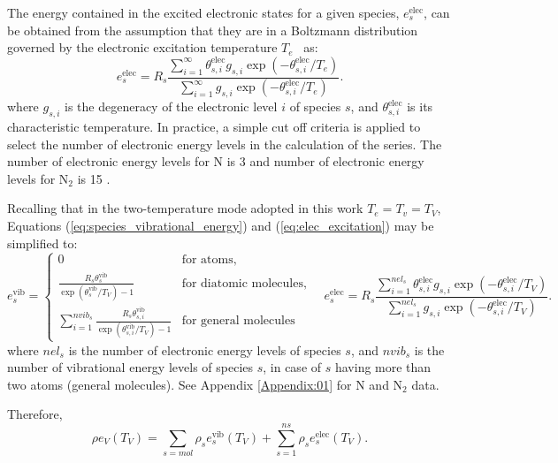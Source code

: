 \documentclass[10pt]{article}
\newcommand{\elec}{\text{elec}}
\newcommand{\vib}{\text{vib}}
\begin{document}
The energy contained in the excited electronic states for a given species, $e^{\elec}_s$, can be obtained from the assumption that they are in a Boltzmann distribution governed by the electronic excitation temperature $T_e$~\citep{candler_thesis} as:
\begin{equation}
  \label{eq:elec_excitation}
  e^{\elec}_s = R_s \dfrac{\sum_{i=1}^\infty \theta^{\elec}_{s,i} g_{s,i} \exp\left(-\theta^{\elec}_{s,i}/T_e\right)}{ \sum_{i=1}^\infty g_{s,i} \exp\left(-\theta^{\elec}_{s,i}/T_e\right)}.
\end{equation}
where $g_{s,i}$ is the degeneracy of the electronic level $i$ of species $s$, and  $\theta^{\elec}_{s,i}$ is its characteristic temperature. In practice, a simple cut off criteria is applied to select the number of electronic energy levels in the calculation of the series. The number of electronic energy levels for N is 3 and number of electronic energy levels for N$_2$ is 15 \citep{Kirk2011}.

Recalling that  in the two-temperature mode adopted in this work $T_e=T_v= T_V$, Equations (\ref{eq:species_vibrational_energy}) and (\ref{eq:elec_excitation}) may be simplified to:
\begin{equation*}
  e^{\text{vib}}_s = 
  \begin{cases}    
    0 & \text{for atoms}, \\
    \frac{R_s\theta^{\vib}_{s}}{\exp\left(\theta^{\vib}_{s}/T_V\right) - 1} & \text{for diatomic molecules}, \\
    \sum_{i=1}^{nvib_s} \frac{R_s\theta^{\vib}_{s,i}}{\exp\left(\theta^{\vib}_{s,i}/T_V\right) - 1} & \text{for general molecules}
  \end{cases}
\quad
e^{\elec}_s = R_s \dfrac{\sum_{i=1}^{nel_s} \theta^{\elec}_{s,i} g_{s,i} \exp\left(-\theta^{\elec}_{s,i}/T_V\right)}{ \sum_{i=1}^{nel_s} g_{s,i} \exp\left(-\theta^{\elec}_{s,i}/T_V\right)}.
\end{equation*}
where $nel_s$ is the number of electronic energy levels of species $s$, and $nvib_s$ is the number of vibrational energy levels of species $s$, in case of $s$ having more than two atoms (general molecules). See Appendix \ref{Appendix:01} for N and N$_2$ data.

Therefore, 
\begin{equation}
  \label{eq:rev-Tv-relationship}
  \rho e_V\left(T_V\right) = \sum_{s=mol} \rho_s e^{\text{vib}}_s\left(T_V\right) + \sum_{s=1}^{ns} \rho_s e^{\text{elec}}_s\left(T_V\right).
\end{equation}
\end{document}
